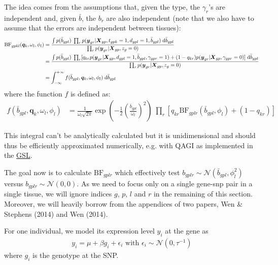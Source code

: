 \documentclass[10pt]{article}
\newcommand{\Norm}{{\mathcal{N}}} %
\newcommand{\BF}{{\text{BF}}} %
\newcommand{\der}{{\text{d}}} %
\newcommand{\Xv}{\mbox{\boldmath$X$}}
\newcommand{\yv}{\mbox{\boldmath$y$}}
\begin{document}
The idea comes from the assumptions that, given the type, the $\gamma_r$'s are independent and, given $\bar{b}$, the $b_r$ are also independent (note that we also have to assume that the errors are independent between tissues):
\begin{equation}
  \begin{aligned}
    \BF_{gpkl}(\bm{q}_k, \omega_l, \phi_l) &= \frac{\int p(\bar{b}_{gpl}) \; \prod_r p(\yv_{gr} | \Xv_{gp}, t_{gpk}=1, d_{gpl}=1, \bar{b}_{gpl}) \; \der \bar{b}_{gpl}}{\prod_r p(\yv_{gr} | \Xv_{gp}, z_g=0)} \\
    &= \frac{\int p(\bar{b}_{gpl}) \; \prod_r [ q_{kr} p(\yv_{gr} | \Xv_{gp}, d_{gpl}=1, \bar{b}_{gpl}, \gamma_{gpr}=1) + (1-q_{kr}) p(\yv_{gr} | \Xv_{gp}, \gamma_{gpr}=0) ] \; \der \bar{b}_{gpl}}{\prod_r p(\yv_{gr} | \Xv_{gp}, z_g=0)} \\
    &= \int_{-\infty}^{+\infty} f(\bar{b}_{gpl}, \bm{q}_k, \omega_l, \phi_l) \; \der \bar{b}_{gpl}
  \end{aligned}
\end{equation}
where the function $f$ is defined as:
\begin{equation}
  \begin{aligned}
    f(\bar{b}_{gpl}, \bm{q}_k, \omega_l, \phi_l) &= \frac{1}{\omega_l \sqrt{2\pi}} \exp \left( -\frac{1}{2} \left( \frac{\bar{b}_{gpl}}{\omega_l} \right)^2 \right) \; \prod_r \left[ q_{kr} \BF_{gplr}(\bar{b}_{gpl}, \phi_l) + (1 - q_{kr}) \right]
  \end{aligned}
\end{equation}

This integral can't be analytically calculated but it is unidimensional and should thus be efficiently approximated numerically, e.g. with QAGI as implemented in the \href{https://www.gnu.org/software/gsl/manual/html_node/QAGI-adaptive-integration-on-infinite-intervals.html}{GSL}.

The goal now is to calculate $\BF_{gplr}$ which effectively test $b_{gplr} \sim \Norm(\bar{b}_{gpl}, \phi_l^2)$ versus $b_{gplr} \sim \Norm(0,0)$.
As we need to focus only on a single gene-snp pair in a single tissue, we will ignore indices $g$, $p$, $l$ and $r$ in the remaining of this section.
Moreover, we will heavily borrow from the appendices of two papers, Wen \& Stephens (2014) and Wen (2014).

For one individual, we model its expression level $y_i$ at the gene as
\begin{equation}
  \begin{aligned}
    y_i = \mu + \beta g_i + \epsilon_i \text{ with } \epsilon_i \sim \Norm(0,\tau^{-1})
    \label{lik_ind}
  \end{aligned}
\end{equation}
where $g_i$ is the genotype at the SNP.
\end{document}

